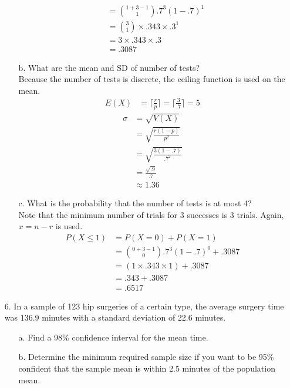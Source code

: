 \documentclass[letterpaper,12pt]{article}
\begin{document}
\begin{enumerate}
\begin{enumerate}
\begin{align*}
          &= \binom{1 + 3 - 1}{1} .7^3 (1 - .7)^1 \\
          &= \binom{3}{1} \times .343 \times .3^1 \\
          &= 3 \times .343 \times .3 \\
          &= .3087
        \end{align*}
      \item[b.]
        What are the mean and SD of number of tests?
        \\
        Because the number of tests is discrete, the ceiling function is used on the mean.
        \begin{align*}
          E(X) &= \bigg\lceil \frac{r}{p} \bigg\rceil = \bigg\lceil \frac{3}{.7} \bigg\rceil = 5
        \end{align*}
        \begin{align*}
          \sigma &= \sqrt{V(X)} \\
          &= \sqrt{\frac{r(1 - p)}{p^2}} \\
          &= \sqrt{\frac{3(1 - .7)}{.7^2}} \\
          &= \frac{\sqrt{.9}}{.7} \\
          &\approx 1.36
        \end{align*}
      \item[c.]
        What is the probability that the number of tests is at most 4?
        \\
        Note that the minimum number of trials for 3 successes is 3 trials. Again, $x = n - r$ is used.
        \begin{align*}
          P(X \le 1) &= P(X = 0) + P(X = 1) \\
          &= \binom{0 + 3 - 1}{0} .7^3 (1 - .7)^0 + .3087 \\
          &= (1 \times .343 \times 1) + .3087 \\
          &= .343 + .3087 \\
          &= .6517
        \end{align*}
    \end{enumerate}
  \item[6.]
    In a sample of 123 hip surgeries of a certain type, the average surgery time was 136.9 minutes with a standard deviation of 22.6 minutes.
    \begin{enumerate}
      \item[a.]
        Find a 98\% confidence interval for the mean time.
      \item[b.]
        Determine the minimum required sample size if you want to be 95\% confident that the sample mean is within 2.5 minutes of the population mean.

\end{enumerate}
\end{enumerate}
\end{document}
